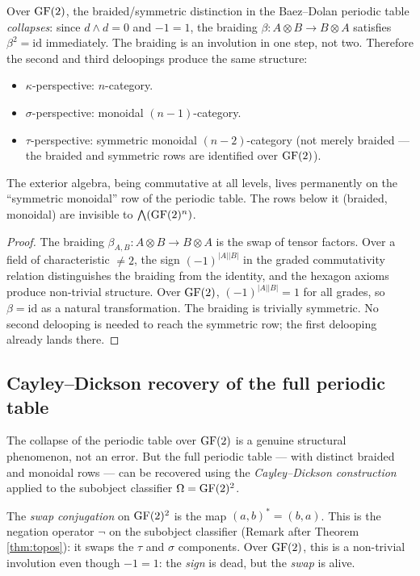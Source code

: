 \begin{corollary}
\label{cor:iterated-deloop}
Over $\operatorname{GF}(2)$, the braided/symmetric distinction in the
Baez--Dolan periodic table \emph{collapses}: since
$d \wedge d = 0$ and $-1 = 1$, the braiding
$\beta: A \otimes B \to B \otimes A$ satisfies
$\beta^2 = \mathrm{id}$ immediately. The braiding is an
involution in one step, not two. Therefore the second and
third deloopings produce the same structure:
\begin{itemize}[nosep]
  \item $\kappa$-perspective: $n$-category.
  \item $\sigma$-perspective: monoidal $(n{-}1)$-category.
  \item $\tau$-perspective: symmetric monoidal
    $(n{-}2)$-category (not merely braided ---
    the braided and symmetric rows are identified over
    $\operatorname{GF}(2)$).
\end{itemize}
The exterior algebra, being commutative at all levels,
lives permanently on the ``symmetric monoidal'' row of
the periodic table. The rows below it (braided,
monoidal) are invisible to $\bigwedge(\operatorname{GF}(2)^n)$.
\end{corollary}

\begin{proof}
The braiding $\beta_{A,B}: A \otimes B \to B \otimes A$
is the swap of tensor factors. Over a field of
characteristic $\neq 2$, the sign $(-1)^{|A||B|}$ in the
graded commutativity relation distinguishes the braiding
from the identity, and the hexagon axioms produce
non-trivial structure. Over $\operatorname{GF}(2)$,
$(-1)^{|A||B|} = 1$ for all grades, so
$\beta = \mathrm{id}$ as a natural transformation. The
braiding is trivially symmetric. No second delooping is
needed to reach the symmetric row; the first delooping
already lands there.
\end{proof}

\subsection{Cayley--Dickson recovery of the full periodic
  table}\label{sec:cayley-dickson}

The collapse of the periodic table over $\operatorname{GF}(2)$ is a
genuine structural phenomenon, not an error. But the
full periodic table --- with distinct braided and
monoidal rows --- can be recovered using the
\emph{Cayley--Dickson construction} applied to the
subobject classifier $\Omega = \operatorname{GF}(2)^2$.

\begin{definition}\label{def:swap-conj}
The \emph{swap conjugation} on $\operatorname{GF}(2)^2$ is the map
$(a, b)^* = (b, a)$. This is the negation operator
$\neg$ on the subobject classifier (Remark after
Theorem \ref{thm:topos}): it swaps the $\tau$ and
$\sigma$ components. Over $\operatorname{GF}(2)$, this is a
non-trivial involution even though $-1 = 1$: the
\emph{sign} is dead, but the \emph{swap} is alive.
\end{definition}

